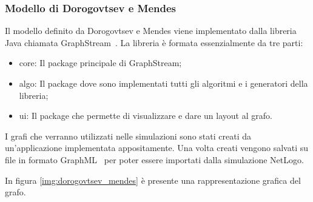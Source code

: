 \subsubsection{Modello di Dorogovtsev e Mendes}
Il modello definito da Dorogovtsev e Mendes viene implementato dalla libreria Java chiamata GraphStream~\cite{biblio:graphstream}.
La libreria è formata essenzialmente da tre parti: 
\begin{itemize}
 \item core: Il package principale di GraphStream;
 \item algo: Il package dove sono implementati tutti gli algoritmi e i generatori della libreria;
 \item ui: Il package che permette di visualizzare e dare un layout al grafo.
\end{itemize}
I grafi che verranno utilizzati nelle simulazioni sono stati creati da un'applicazione implementata appositamente.
Una volta creati vengono salvati su file in formato GraphML~\cite{biblio:graphml} per poter 
essere importati dalla simulazione NetLogo.

In figura \ref{img:dorogovtsev_mendes} è presente una rappresentazione grafica del grafo.




